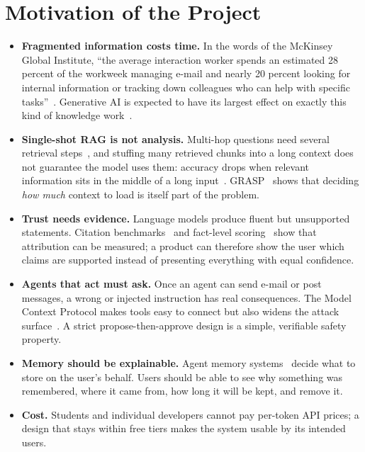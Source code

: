 \section{Motivation of the Project}
\begin{itemize}
\item \textbf{Fragmented information costs time.} In the words of the McKinsey Global Institute, ``the average interaction worker spends an estimated 28 percent of the workweek managing e-mail and nearly 20 percent looking for internal information or tracking down colleagues who can help with specific tasks''~\cite{mckinseyweb}. Generative AI is expected to have its largest effect on exactly this kind of knowledge work~\cite{mckinsey}.
\item \textbf{Single-shot RAG is not analysis.} Multi-hop questions need several retrieval steps~\cite{trivedi2023ircot,press2023selfask}, and stuffing many retrieved chunks into a long context does not guarantee the model uses them: accuracy drops when relevant information sits in the middle of a long input~\cite{liu2024lost}. GRASP~\cite{grasp2026} shows that deciding \emph{how much} context to load is itself part of the problem.
\item \textbf{Trust needs evidence.} Language models produce fluent but unsupported statements. Citation benchmarks~\cite{gao2023alce} and fact-level scoring~\cite{min2023factscore} show that attribution can be measured; a product can therefore show the user which claims are supported instead of presenting everything with equal confidence.
\item \textbf{Agents that act must ask.} Once an agent can send e-mail or post messages, a wrong or injected instruction has real consequences. The Model Context Protocol makes tools easy to connect but also widens the attack surface~\cite{hou2025mcp}. A strict propose-then-approve design is a simple, verifiable safety property.
\item \textbf{Memory should be explainable.} Agent memory systems~\cite{packer2023memgpt,park2023generative} decide what to store on the user's behalf. Users should be able to see why something was remembered, where it came from, how long it will be kept, and remove it.
\item \textbf{Cost.} Students and individual developers cannot pay per-token API prices; a design that stays within free tiers makes the system usable by its intended users.
\end{itemize}


